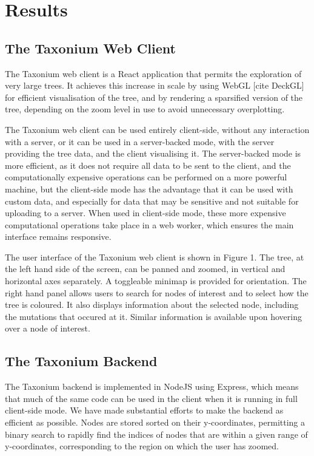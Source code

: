 \section*{Results}\label{s:results}

\subsection*{The Taxonium Web Client}

The Taxonium web client is a React application that permits the exploration of very large trees. It achieves this increase in scale by using WebGL [cite DeckGL] for efficient visualisation of the tree, and by rendering a sparsified version of the tree, depending on the zoom level in use to avoid unnecessary overplotting.

The Taxonium web client can be used entirely client-side, without any interaction with a server, or it can be used in a server-backed mode, with the server providing the tree data, and the client visualising it. The server-backed mode is more efficient, as it does not require all data to be sent to the client, and the computationally expensive operations can be performed on a more powerful machine, but the client-side mode has the advantage that it can be used with custom data, and especially for data that may be sensitive and not suitable for uploading to a server. When used in client-side mode, these more expensive computational operations take place in a web worker, which ensures the main interface remains responsive.

The user interface of the Taxonium web client is shown in Figure 1. The tree, at the left hand side of the screen, can be panned and zoomed, in vertical and horizontal axes separately.  A toggleable minimap is provided for orientation. The right hand panel allows users to search for nodes of interest and to select how the tree is coloured. It also displays information about the selected node, including the mutations that occured at it. Similar information is available upon hovering over a node of interest.

\subsection*{The Taxonium Backend}

The Taxonium backend is implemented in NodeJS using Express, which means that much of the same code can be used in the client when it is running in full client-side mode. We have made substantial efforts to make the backend as efficient as possible. Nodes are stored sorted on their y-coordinates, permitting a binary search to rapidly find the indices of nodes that are within a given range of y-coordinates, corresponding to the region on which the user has zoomed.


